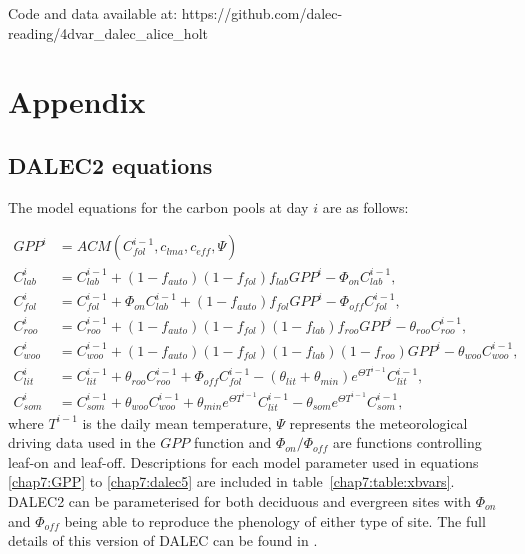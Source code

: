 Code and data available at: https://github.com/dalec-reading/4dvar\_dalec\_alice\_holt

\section{Appendix} \label{chap7:sec:appendix}

\subsection{DALEC2 equations} \label{chap7:sec:dalec_eqns}

The model equations for the carbon pools at day $i$ are as follows:

\begin{align}
GPP^{i} &= ACM(C_{fol}^{i-1}, c_{lma}, c_{eff}, \Psi) \label{chap7:GPP}
\\C_{lab}^{i}&=C_{lab}^{i-1}+(1-f_{auto})(1-f_{fol})f_{lab}GPP^{i}-\Phi _{on}C_{lab}^{i-1}, \label{chap7:daleclab}
\\C_{fol}^{i}&=C_{fol}^{i-1}+\Phi_{on}C_{lab}^{i-1}+(1-f_{auto})f_{fol}GPP^{i}-\Phi_{off}C_{fol}^{i-1}, \label{chap7:dalec1}
\\C_{roo}^{i}&=C_{roo}^{i-1}+(1-f_{auto})(1-f_{fol})(1-f_{lab})f_{roo}GPP^{i}-\theta_{roo}C_{roo}^{i-1}, 
\\C_{woo}^{i}&=C_{woo}^{i-1}+(1-f_{auto})(1-f_{fol})(1-f_{lab})(1-f_{roo})GPP^{i}-\theta_{woo}C_{woo}^{i-1}, 
\\C_{lit}^{i}&=C_{lit}^{i-1}+\theta_{roo}C_{roo}^{i-1}+\Phi_{off}C_{fol}^{i-1}-(\theta_{lit}+\theta_{min})e^{\Theta T^{i-1}}C_{lit}^{i-1}, 
\\C_{som}^{i}&=C_{som}^{i-1}+\theta_{woo}C_{woo}^{i-1}+\theta_{min}e^{\Theta T^{i-1}}C_{lit}^{i-1}-\theta_{som}e^{\Theta T^{i-1}}C_{som}^{i-1}, \label{chap7:dalec5}
\end{align}
where $T^{i-1}$ is the daily mean temperature, $\Psi$ represents the meteorological driving data used in the $GPP$ function and $\Phi_{on} / \Phi_{off}$ are functions controlling leaf-on and leaf-off. Descriptions for each model parameter used in equations \eqref{chap7:GPP} to \eqref{chap7:dalec5} are included in table~\ref{chap7:table:xbvars}. DALEC2 can be parameterised for both deciduous and evergreen sites with $\Phi_{on}$ and $\Phi_{off}$ being able to reproduce the phenology of either type of site. The full details of this version of DALEC can be found in \cite{Bloom2015}. 

